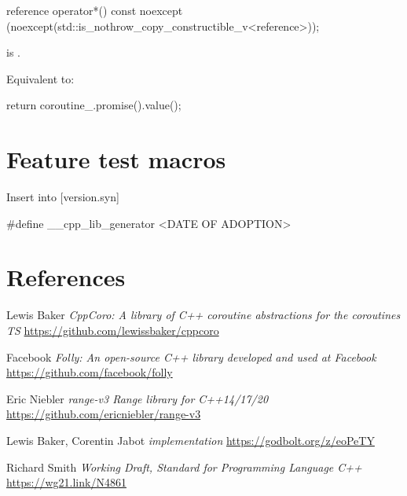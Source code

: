 \documentclass{wg21}
\begin{document}
\begin{addedblock}
\begin{itemdecl}
reference operator*() const 
noexcept (noexcept(std::is_nothrow_copy_constructible_v<reference>));
\end{itemdecl}

\begin{itemdescr}
\precondition {} is .

\effects
Equivalent to:
\begin{codeblock}
    return coroutine_.promise().value();
\end{codeblock}
\end{itemdescr}
    
       
\end{addedblock}

\section{Feature test macros}

Insert into [version.syn]

\begin{addedblock}
\begin{codeblock}
    #define __cpp_lib_generator <DATE OF ADOPTION>
\end{codeblock}
\end{addedblock}
    
    
\section{References}
\renewcommand{\section}[2]{}%



\begin{thebibliography}{9}
    Lewis Baker
    \emph{CppCoro: A library of C++ coroutine abstractions for the coroutines TS}\newline
    \url{https://github.com/lewissbaker/cppcoro}
    
    Facebook
    \emph{Folly: An open-source C++ library developed and used at Facebook}\newline
    \url{https://github.com/facebook/folly}
    
    
    Eric Niebler
    \emph{range-v3 Range library for C++14/17/20}\newline
    \url{https://github.com/ericniebler/range-v3}
    
    Lewis Baker, Corentin Jabot
    \emph{ implementation}\newline
    \url{https://godbolt.org/z/eoPeTY}
    
    Richard Smith
    \emph{Working Draft, Standard for Programming Language C++}\newline
    \url{https://wg21.link/N4861}
    
    
\end{thebibliography}
    
\end{document}
